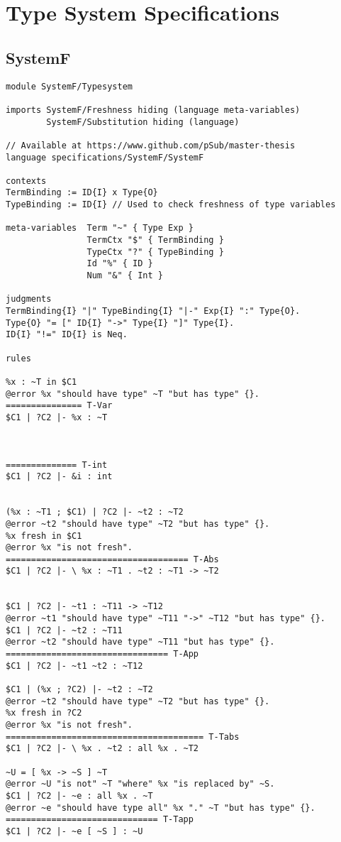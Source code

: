 \chapter{Type System Specifications}
\section{SystemF}
\label{appendix:systemf}
\begin{lstlisting}[language=sltc]
module SystemF/Typesystem

imports SystemF/Freshness hiding (language meta-variables)
        SystemF/Substitution hiding (language)

// Available at https://www.github.com/pSub/master-thesis
language specifications/SystemF/SystemF

contexts
TermBinding := ID{I} x Type{O}
TypeBinding := ID{I} // Used to check freshness of type variables

meta-variables  Term "~" { Type Exp }
                TermCtx "$" { TermBinding }
                TypeCtx "?" { TypeBinding }
                Id "%" { ID }
                Num "&" { Int }

judgments
TermBinding{I} "|" TypeBinding{I} "|-" Exp{I} ":" Type{O}.
Type{O} "= [" ID{I} "->" Type{I} "]" Type{I}.
ID{I} "!=" ID{I} is Neq.

rules

%x : ~T in $C1
@error %x "should have type" ~T "but has type" {}.
=============== T-Var
$C1 | ?C2 |- %x : ~T



============== T-int
$C1 | ?C2 |- &i : int


(%x : ~T1 ; $C1) | ?C2 |- ~t2 : ~T2
@error ~t2 "should have type" ~T2 "but has type" {}.
%x fresh in $C1
@error %x "is not fresh".
==================================== T-Abs
$C1 | ?C2 |- \ %x : ~T1 . ~t2 : ~T1 -> ~T2


$C1 | ?C2 |- ~t1 : ~T11 -> ~T12
@error ~t1 "should have type" ~T11 "->" ~T12 "but has type" {}.
$C1 | ?C2 |- ~t2 : ~T11
@error ~t2 "should have type" ~T11 "but has type" {}.
================================ T-App
$C1 | ?C2 |- ~t1 ~t2 : ~T12

$C1 | (%x ; ?C2) |- ~t2 : ~T2
@error ~t2 "should have type" ~T2 "but has type" {}.
%x fresh in ?C2
@error %x "is not fresh".
======================================= T-Tabs
$C1 | ?C2 |- \ %x . ~t2 : all %x . ~T2

~U = [ %x -> ~S ] ~T
@error ~U "is not" ~T "where" %x "is replaced by" ~S.
$C1 | ?C2 |- ~e : all %x . ~T
@error ~e "should have type all" %x "." ~T "but has type" {}.
============================== T-Tapp
$C1 | ?C2 |- ~e [ ~S ] : ~U
\end{lstlisting}
